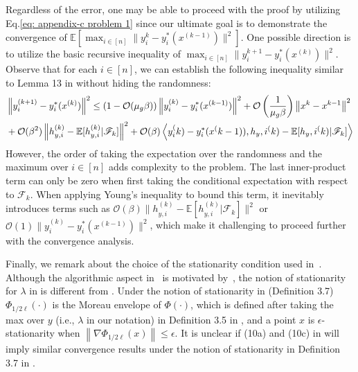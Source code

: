 \documentclass[10pt]{article}
\theoremstyle{remark}
\newcommand{\cO}{\mathcal{O}}
\def\setF{\mathscr{F}} %
\newcommand{\E}{\mathbb{E}}
\newcommand{\norm}[1]{\left\|#1\right\|}
\def\<#1,#2>{\left\langle #1,#2\right\rangle}
\begin{document}
Regardless of the error, one may be able to proceed with the proof by utilizing Eq.\eqref{eq: appendix-c problem 1} since our ultimate goal is to demonstrate the convergence of $\E[\max_{i\in [n]}\|y_i^{k} - y_i^*(x^{(k-1)})\|^2]$. One possible direction is to utilize the basic recursive inequality of $\max_{i\in [n]}\|y_i^{k+1} - y_i^*(x^{(k)}) \|^2$. Observe that for each $i\in[n]$, we can establish the following inequality similar to Lemma 13 in \cite{gu2022min} without hiding the randomness:
\begin{align}
    &\norm{y_i^{(k+1)} - y_i^*(x^{(k)})}^2 \leq \left(1-\cO(\mu_g\beta)\right) \norm{y_i^{(k)} - y_i^*(x^{(k-1)})}^2 + \cO\left(\frac{1}{\mu_g\beta}\right)\norm{x^{k} - x^{k-1}}^2 \\
    &+ \cO(\beta^2) \norm{h_{y,i}^{(k)} - \E[h_{y,i}^{(k)}|\setF_k]}^2 + \cO(\beta)\< y_i^{(k)} - y_i^*(x^{(k-1)}),h_{y,i}^{(k)} - \E[h_{y,i}^{(k)}|\setF_k] >\notag
\end{align}
However, the order of taking the expectation over the randomness and the maximum over $i\in[n]$ adds complexity to the problem. The last inner-product term can only be zero when first taking the conditional expectation with respect to $\setF_k$. When applying Young's inequality to bound this term, it inevitably introduces terms such as $\cO(\beta) \|h_{y,i}^{(k)} - \E[h_{y,i}^{(k)}|\setF_k]\|^2$ or $\cO(1) \|y_i^{(k)} - y_i^*(x^{(k-1)})\|^2$, which make it challenging to proceed further with the convergence analysis.


Finally, we remark about the choice of the stationarity condition used in~\cite{gu2022min}. Although the algorithmic aspect in~\cite{gu2022min} is motivated by~\cite{lin2020gradient}, the notion of stationarity for $\lambda$ in \cite{gu2022min} is different from \cite{lin2020gradient}. Under the notion of stationarity in \cite{lin2020gradient} (Definition 3.7) $\Phi_{1/2\ell}(\cdot)$ is the Moreau envelope of $\Phi(\cdot)$, which is defined after taking the max over $y$ (i.e., $\lambda$ in our notation) in Definition 3.5 in \cite{lin2020gradient}, and a point $x$ is $\epsilon$-stationarity when $\norm{\nabla \Phi_{1/2\ell}(x)}\leq \epsilon$. It is unclear if (10a) and (10c) in \cite{gu2022min} will imply similar convergence results under the notion of stationarity in Definition 3.7 in \cite{lin2020gradient}. %
\end{document}
